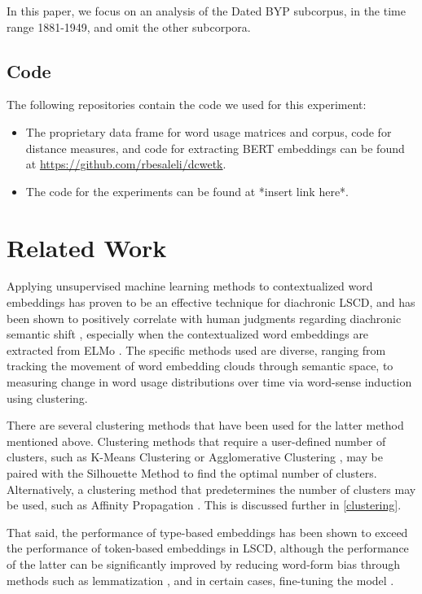\documentclass[10pt, a4paper]{article}
\begin{document}
In this paper, we focus on an analysis of the Dated BYP subcorpus, in the time range 1881-1949, and omit the other subcorpora.
\subsection{Code}
The following repositories contain the code we used for this experiment:
\begin{itemize}
    \item The proprietary data frame for word usage matrices and corpus, code for distance measures, and code for extracting BERT embeddings can be found at \href{https://github.com/rbesaleli/dcwetk}{https://github.com/rbesaleli/dcwetk}.
    \item The code for the experiments can be found at *insert link here*.
\end{itemize}
\section{Related Work}
Applying unsupervised machine learning methods to contextualized word embeddings has proven to be an effective technique for diachronic LSCD, and has been shown to positively correlate with human judgments regarding diachronic semantic shift \cite{Giulianelli2020,Kutuzov2020}, especially when the contextualized word embeddings are extracted from ELMo \cite{Kutuzov2020}. The specific methods used are diverse, ranging from tracking the movement of word embedding clouds through semantic space, to measuring change in word usage distributions over time via word-sense induction using clustering.

There are several clustering methods that have been used for the latter method mentioned above. Clustering methods that require a user-defined number of clusters, such as K-Means Clustering  \cite{Giulianelli2020} or Agglomerative Clustering \cite{Laicher2021}, may be paired with the Silhouette Method to find the optimal number of clusters. Alternatively, a clustering method that predetermines the number of clusters may be used, such as Affinity Propagation \cite{Martinc2020,Kutuzov2020}. This is discussed further in \ref{clustering}.

That said, the performance of type-based embeddings has been shown to exceed the performance of token-based embeddings in LSCD, although the performance of the latter can be significantly improved by reducing word-form bias through methods such as lemmatization \cite{Laicher2021}, and in certain cases, fine-tuning the model \cite{Martinc2020}. 
\end{document}
